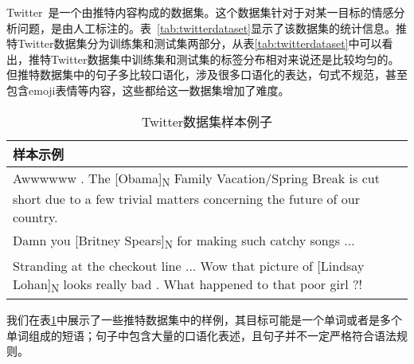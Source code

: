 Twitter~\cite{dong2014adaptive}是一个由推特内容构成的数据集。这个数据集针对于对某一目标的情感分析问题，是由人工标注的。表~\ref{tab:twitterdataset}显示了该数据集的统计信息。推特Twitter数据集分为训练集和测试集两部分，从表\ref{tab:twitterdataset}中可以看出，推特Twitter数据集中训练集和测试集的标签分布相对来说还是比较均匀的。但推特数据集中的句子多比较口语化，涉及很多口语化的表达，句式不规范，甚至包含emoji表情等内容，这些都给这一数据集增加了难度。


\begin{table}[H]
	\centering
	\begin{minipage}[t]{0.8\linewidth} %
		\caption[Twitter数据集样本例子]{Twitter数据集样本例子}
		\label{tab:twitter-case}
		\begin{tabularx}{\linewidth}{X}
			\toprule[1.5pt]
			{\heiti 样本示例} \\\midrule[1pt]
				Awwwwww . The [Obama]\textsubscript{N} Family Vacation/Spring Break is cut short due to a few trivial matters concerning the future of our country. \\ \midrule[1pt]
				Damn you [Britney Spears]\textsubscript{N} for making such catchy songs ... \\ \midrule[1pt]
				Stranding at the checkout line ... Wow that picture of [Lindsay Lohan]\textsubscript{N} looks really bad . What happened to that poor girl ?! \\
			\bottomrule[1.5pt]
		\end{tabularx}
	\end{minipage}
\end{table}

我们在表\ref{tab:twitter-case}中展示了一些推特数据集中的样例，其目标可能是一个单词或者是多个单词组成的短语；句子中包含大量的口语化表述，且句子并不一定严格符合语法规则。

